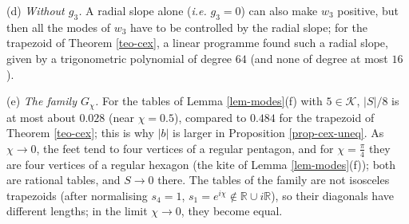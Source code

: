 \documentclass[a4paper,11pt,twoside,leqno]{article}
\newcommand{\ie}[0]{\emph{i.e.} }
\newcommand{\rr}[0]{\ensuremath{\mathbb{R}}}
\numberwithin{equation}{section}
\begin{document}
\begin{rmk}
(d) \emph{Without $g_3$.} A radial slope alone (\ie $g_3 = 0$) can also make $w_3$ positive, but then all the modes of $w_3$ have to be controlled by the radial slope; for the trapezoid of Theorem \ref{teo-cex}, a linear programme found such a radial slope, given by a trigonometric polynomial of degree $64$ (and none of degree at most $16$).

(e) \emph{The family $G_\chi$.} For the tables of Lemma \ref{lem-modes}(f) with $5 \in \mathcal{K}$, $|S|/8$ is at most about $0.028$ (near $\chi = 0.5$), compared to $0.484$ for the trapezoid of Theorem \ref{teo-cex}; this is why $|b|$ is larger in Proposition \ref{prop-cex-uneq}. As $\chi \to 0$, the feet tend to four vertices of a regular pentagon, and for $\chi = \frac{\pi}{4}$ they are four vertices of a regular hexagon (the kite of Lemma \ref{lem-modes}(f)); both are rational tables, and $S \to 0$ there. The tables of the family are not isosceles trapezoids (after normalising $s_4 = 1$, $s_1 = e^{i\chi} \notin \rr \cup i\rr$), so their diagonals have different lengths; in the limit $\chi \to 0$, they become equal.


\end{rmk}
\end{document}

